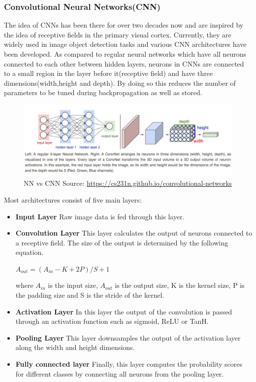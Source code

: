 \subsubsection*{Convolutional Neural Networks(CNN)}
The idea of CNNs has been there for over two decades now and are inspired by the idea of receptive fields in the primary visual cortex. Currently, they are widely used in image object detection tasks and various CNN architectures have been developed. As compared to regular neural networks which have all neurons connected to each other between hidden layers, neurons in CNNs are connected to a small region in the layer before it(receptive field) and have three dimensions(width,height and depth). By doing so this reduces the number of parameters to be tuned during backpropagation as well as stored. 
\begin{figure}[h]
	\centering 
	\includegraphics[width=\linewidth]{images/neuralnet}
	\caption{NN vs CNN Source: \url{https://cs231n.github.io/convolutional-networks}}
	\label{fig:cnn}
\end{figure}


Most architectures consist of five main layers:
\begin{itemize}[noitemsep]
	\item  \textbf{Input Layer} Raw image data is fed through this layer. 
	\item  \textbf{Convolution Layer} This layer calculates the output of neurons connected to a receptive field.
	The size of the output is determined by the following equation. 
	
	$A_{out}= (A_{in}-K+2P)/S+1$
	
	where $A_{in}$ is the input size,  $A_{out}$ is the output size, K is the kernel size, P is the padding size and S is the stride of the kernel. 
	\item  \textbf{Activation Layer} In this layer the output of the convolution is passed through an activation function such as sigmoid, ReLU or TanH. 
	\item  \textbf{Pooling Layer} This layer downsamples the  output of the activation layer along the width and height dimensions. 
	\item \textbf{Fully connected layer} Finally, this layer computes the probability scores for different classes by connecting all neurons from the pooling layer. 
\end{itemize}

